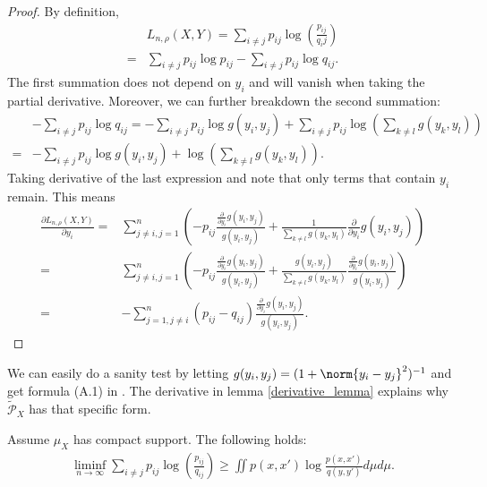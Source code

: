 \begin{proof}
    By definition,
    \begin{align}
          & L_{n, \rho}(X,Y) = \sum_{i \neq j} p_{ij} \log \left(\frac{p_{ij}}{q_ij}\right) \nonumber \\
        = & \sum_{i \neq j} p_{ij} \log p_{ij} - \sum_{i \neq j} p_{ij} \log q_{ij}.
    \end{align}
    The first summation does not depend on $y_i$ and will vanish when taking the partial derivative. Moreover, we can further breakdown the second summation:
    \begin{align}
          & - \sum_{i \neq j} p_{ij} \log q_{ij} = - \sum_{i \neq j} p_{ij} \log g(y_i,y_j) + \sum_{i \neq j} p_{ij} \log \left(\sum_{k \neq l} g(y_k,y_l) \right)\nonumber \\
        = & - \sum_{i \neq j} p_{ij} \log g(y_i,y_j) + \log \left(\sum_{k \neq l} g(y_k,y_l)\right).
    \end{align}
    Taking derivative of the last expression and note that only terms that contain $y_i$ remain. This means
    \begin{align} \label{L_derivative}
        \frac{\partial L_{n, \rho}(X,Y)}{\partial y_i} = & \sum_{j \neq i, j = 1}^n \left(-p_{ij}\frac{\frac{\partial}{\partial y_i}g(y_i,y_j)}{g(y_i,y_j)} + \frac{1}{\sum_{k \neq l} g(y_k,y_l)} \frac{\partial}{\partial y_i} g(y_i,y_j)\right) \nonumber                            \\
        =                                                & \sum_{j \neq i, j = 1}^n \left(-p_{ij}\frac{\frac{\partial}{\partial y_i}g(y_i,y_j)}{g(y_i,y_j)} + \frac{g(y_i,y_j)}{\sum_{k \neq l} g(y_k,y_l)} \frac{\frac{\partial}{\partial y_i}g(y_i,y_j)}{g(y_i,y_j)}\right) \nonumber \\
        =                                                & -\sum_{j=1, j \neq i}^n (p_{ij}-q_{ij}) \frac{\frac{\partial}{\partial y_i}g(y_i,y_j)}{g(y_i,y_j)}.
    \end{align}
\end{proof}
We can easily do a sanity test by letting $g(y_i,y_j) = (1+\norm{y_i-y_j}^2)^{-1}$ and get formula (A.1) in \cite{auffinger-tsne}. The derivative in lemma \ref{derivative_lemma} explains why
$\tilde{\mathcal{{P}}}_X$ has that specific form.
\begin{lemma} \label{lower_bound_lemma_2}
    Assume $\mu_X$ has compact support. The following holds:
    \begin{align}
        \liminf_{n \to \infty}\sum_{i \neq j} p_{ij} \log \left(\frac{p_{ij}}{q_{ij}}\right) \geq \iint p(x,x')\log \frac{p(x,x')}{q(y,y')} d\mu d\mu.
    \end{align}
\end{lemma}
